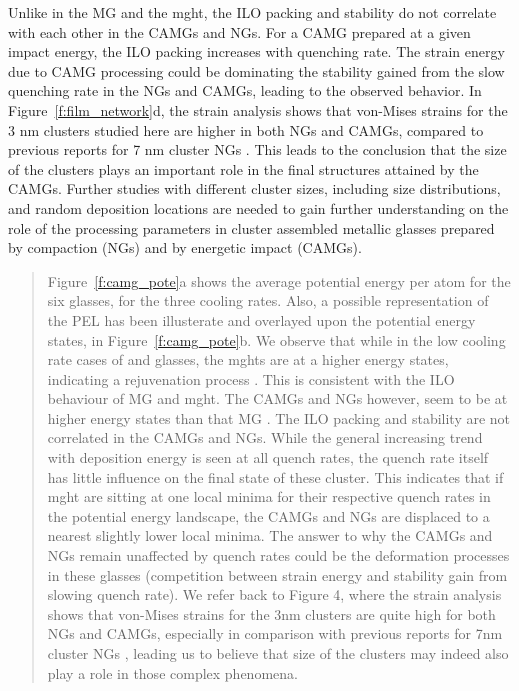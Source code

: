 \begin{selfcite}
Unlike in the MG and the \gls{mght}, the ILO packing and stability do not correlate with each other in the CAMGs and NGs. For a CAMG prepared at a given impact energy, the ILO packing increases with quenching rate. The strain energy due to CAMG processing could be dominating the stability gained from the slow quenching rate in the NGs and CAMGs, leading to the observed behavior. In Figure~\ref{f:film_network}d, the strain analysis shows that von-Mises strains for the 3 nm clusters studied here are higher in both NGs and CAMGs, compared to previous reports for 7 nm cluster NGs \cite{Adjaoud2018}. This leads to the conclusion that the size of the clusters plays an important role in the final structures attained by the CAMGs. Further studies with different cluster sizes, including size distributions, and random deposition locations are needed to gain further understanding on the role of the processing parameters in cluster assembled metallic glasses prepared by compaction (NGs) and by energetic impact (CAMGs). \par
\end{selfcite}

\begin{quote}
Figure~\ref{f:camg_pote}a shows the average potential energy per atom for the six glasses, for the three cooling rates. Also, a possible representation of the PEL has been illusterate and overlayed upon the potential energy states, in Figure~\ref{f:camg_pote}b. We observe that while in the low cooling rate cases of  and  \cz glasses, the \gls{mght}s are at a higher energy states, indicating a rejuvenation process \cite{Wakeda2015,Saida2017}. This is consistent with the ILO behaviour of MG and \gls{mght}. The CAMGs and NGs however, seem to be at higher energy states than that MG . The ILO packing and stability are not correlated in the CAMGs and NGs. While the general increasing trend with deposition energy is seen at all quench rates, the quench rate itself has little influence on the final state of these cluster. This indicates that if \gls{mght} are sitting at one local minima for their respective quench rates in the potential energy landscape, the CAMGs and NGs are displaced to a nearest slightly lower local minima. The answer to why the CAMGs and NGs remain unaffected by quench rates could be the deformation processes in these glasses (competition between strain energy and stability gain from slowing quench rate). We refer back to Figure 4, where the strain analysis shows that von-Mises strains for the 3nm clusters are quite high for both NGs and CAMGs, especially in comparison with previous reports for 7nm cluster NGs \cite{Adjaoud2018}, leading us to believe that size of the clusters may indeed also play a role in those complex phenomena. \par
\end{quote}

